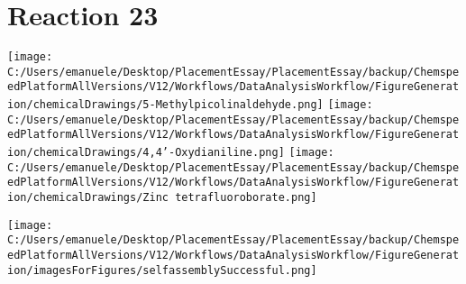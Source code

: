 \documentclass{article}%
\begin{document}
\section*{Reaction 23}%
%
\begin{scheme}[H]%
\begin{minipage}{0.5\textwidth}%
\texttt{[image: C:/Users/emanuele/Desktop/PlacementEssay/PlacementEssay/backup/ChemspeedPlatformAllVersions/V12/Workflows/DataAnalysisWorkflow/FigureGeneration/chemicalDrawings/5-Methylpicolinaldehyde.png]}%
\texttt{[image: C:/Users/emanuele/Desktop/PlacementEssay/PlacementEssay/backup/ChemspeedPlatformAllVersions/V12/Workflows/DataAnalysisWorkflow/FigureGeneration/chemicalDrawings/4,4'-Oxydianiline.png]}%
\texttt{[image: C:/Users/emanuele/Desktop/PlacementEssay/PlacementEssay/backup/ChemspeedPlatformAllVersions/V12/Workflows/DataAnalysisWorkflow/FigureGeneration/chemicalDrawings/Zinc tetrafluoroborate.png]}%
\end{minipage}%
\begin{minipage}{0.5\textwidth}%
\begin{center}%
\texttt{[image: C:/Users/emanuele/Desktop/PlacementEssay/PlacementEssay/backup/ChemspeedPlatformAllVersions/V12/Workflows/DataAnalysisWorkflow/FigureGeneration/imagesForFigures/selfassemblySuccessful.png]}%
\end{center}%
\end{minipage}%
\caption{Self-assembly of components 3, 15, with Zinc(II) in a 3.0:1.5:1.0 molar ratio in CH$_3$CN at 60\textdegree C for 40h. These are the reagents (starting materials) for reaction 23.}%
\end{scheme}%
\end{document}
